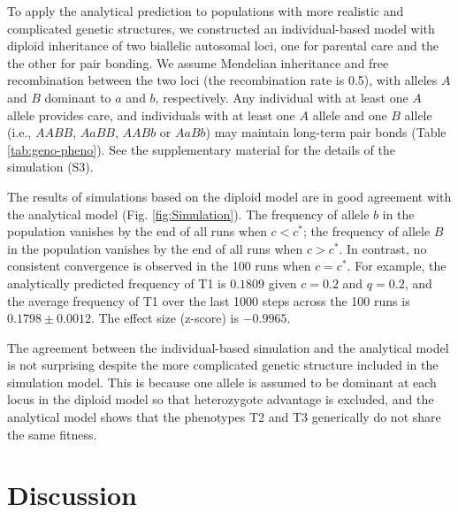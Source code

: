 \documentclass[12pt]{article}
\begin{document}
To apply the analytical prediction to populations with more realistic and complicated genetic structures, we constructed an individual-based model with diploid inheritance of two biallelic autosomal loci, one for parental care and the the other for pair bonding. We assume Mendelian inheritance and free recombination between the two loci (the recombination rate is 0.5), with alleles $A$ and $B$ dominant to $a$ and $b$, respectively. Any individual with at least one $A$ allele provides care, and individuals with at least one $A$ allele and one $B$ allele (i.e., $AABB$, $AaBB$, $AABb$ or $AaBb$) may maintain long-term pair bonds (Table \ref{tab:geno-pheno}). See the supplementary material for the details of the simulation (S3).

The results of simulations based on the diploid model are in good agreement with the analytical model (Fig. \ref{fig:Simulation}). The frequency of allele $b$ in the population vanishes by the end of all runs when $c<c^*$; the frequency of allele $B$ in the population vanishes by the end of all runs when $c>c^*$. In contrast, no consistent convergence is observed in the 100 runs when $c=c^*$. For example, the analytically predicted frequency of T1 is $0.1809$ given $c=0.2$ and $q=0.2$, and the average frequency of T1 over the last 1000 steps across the 100 runs is $0.1798 \pm 0.0012$. The effect size (z-score) is $-0.9965$.

The agreement between the individual-based simulation and the analytical model is not surprising despite the more complicated genetic structure included in the simulation model. This is because one allele is assumed to be dominant at each locus in the diploid model so that heterozygote advantage is excluded, and the analytical model shows that the phenotypes T2 and T3 generically do not share the same fitness. 

\section*{Discussion}
\end{document}
